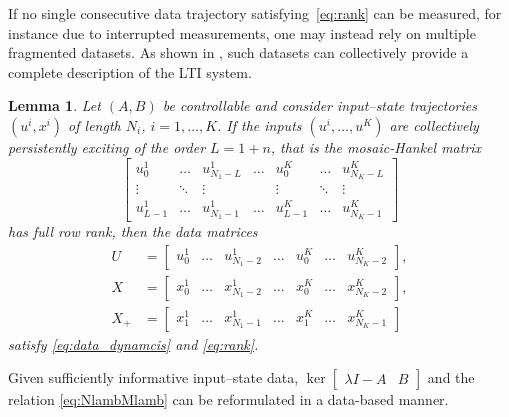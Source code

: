 \documentclass[11pt]{article}
\theoremstyle{plain}
\newtheorem{lemma}[theorem]{Lemma}
\theoremstyle{definition}
\theoremstyle{remark}
\begin{document}
If no single consecutive data trajectory satisfying~\eqref{eq:rank} can be measured, for instance due to interrupted measurements, one may instead rely on multiple fragmented datasets. As shown in \cite[Theorem~2]{van2020willems}, such datasets can collectively provide a complete description of the LTI system.
\begin{lemma}
\label{lem:FLfrag}
    Let $(A,B)$ be controllable and consider input--state trajectories $(u^i, x^i)$ of length $N_i$, $i=1,\dots,K$. If the inputs $(u^i, \dots, u^K)$ are collectively persistently exciting of the order $L=1+n$, that is the mosaic-Hankel matrix
    \begin{equation}
        \begin{bmatrix}
            u_0^1 & \dots & u_{N_1-L}^1 & \dots & u_{0}^K & \dots & u_{N_K-L}^K\\
            \vdots & \ddots & \vdots & & \vdots & \ddots & \vdots\\
            u_{L-1}^1 & \dots & u_{N_1-1}^1 & \dots & u_{L-1}^K & \dots & u_{N_K-1}^K
        \end{bmatrix}
    \end{equation}
    has full row rank, then the data matrices
    \begin{equation*}
    \begin{aligned}
        U &= \begin{bmatrix}
            u_0^1&\dots & u_{N_1-2}^1 & \dots & u_{0}^K & \dots & u_{N_K-2}^K
        \end{bmatrix},\\[0.5em]
        X &= \begin{bmatrix}
            x_0^1&\dots & x_{N_1-2}^1 & \dots & x_{0}^K & \dots & x_{N_K-2}^K
        \end{bmatrix},\\[0.5em]
        X_+ &= \begin{bmatrix}
            x_1^1&\dots & x_{N_1-1}^1 & \dots & x_{1}^K & \dots & x_{N_K-1}^K
        \end{bmatrix}
    \end{aligned}
    \end{equation*}
    satisfy \eqref{eq:data_dynamcis} and \eqref{eq:rank}.
\end{lemma}
Given sufficiently informative input--state data, $\operatorname{ker}\begin{bmatrix}
    \lambda I-A & B
\end{bmatrix}$ and the relation \eqref{eq:NlambMlamb} can be reformulated in a data-based manner.
\end{document}
